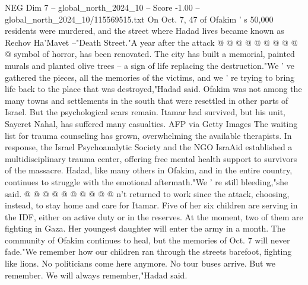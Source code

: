 \begin{textsample}{NEG Dim 7 – global\_north\_2024\_10 – Score -1.00 – global\_north\_2024\_10/115569515.txt}
On Oct. 7, 47 of Ofakim ' s 50,000 residents were murdered, and the street where Hadad lives became known as Rechov Ha'Mavet --"Death Street."A year after the attack @ @ @ @ @ @ @ @ @ @ symbol of horror, has been renovated.
The city has built a memorial, painted murals and planted olive trees -- a sign of life replacing the destruction."We ' ve gathered the pieces, all the memories of the victims, and we ' re trying to bring life back to the place that was destroyed,"Hadad said.
Ofakim was not among the many towns and settlements in the south that were resettled in other parts of Israel.
But the psychological scars remain.
Itamar had survived, but his unit, Sayeret Nahal, has suffered many casualties.
AFP via Getty Images The waiting list for trauma counseling has grown, overwhelming the available therapists.
In response, the Israel Psychoanalytic Society and the NGO IsraAid established a multidisciplinary trauma center, offering free mental health support to survivors of the massacre.
Hadad, like many others in Ofakim, and in the entire country, continues to struggle with the emotional aftermath."We ' re still bleeding,"she said. @ @ @ @ @ @ @ @ @ @ n't returned to work since the attack, choosing, instead, to stay home and care for Itamar.
Five of her six children are serving in the IDF, either on active duty or in the reserves.
At the moment, two of them are fighting in Gaza.
Her youngest daughter will enter the army in a month.
The community of Ofakim continues to heal, but the memories of Oct. 7 will never fade."We remember how our children ran through the streets barefoot, fighting like lions.
No politicians come here anymore.
No tour buses arrive.
But we remember.
We will always remember,"Hadad said.

\end{textsample}
